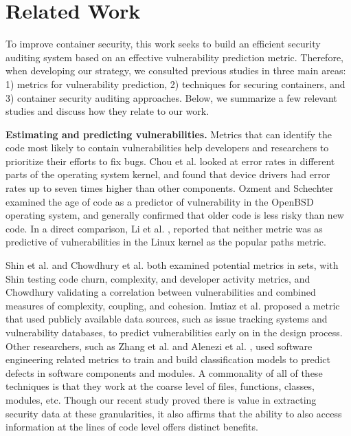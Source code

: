\section{Related Work}
\label{sec.related_work}
To improve container security, this work seeks to build an efficient security auditing system based on an effective vulnerability prediction metric. 
Therefore, when developing our strategy, we consulted previous studies in three main areas: 1) metrics for vulnerability prediction, 2) techniques for securing containers, 
and 3) container security auditing approaches. Below, we summarize a few relevant studies and discuss how they relate to our work. 

\textbf{Estimating and predicting vulnerabilities.} 
Metrics that can identify the code most likely to contain vulnerabilities help developers and researchers to prioritize their efforts to fix bugs. 
Chou et al. \cite{Chou} looked at error rates in different parts of the operating system kernel, and found that device drivers had error rates up to seven times higher than other components. 
Ozment and Schechter \cite{Ozment} examined the age of code as a predictor of vulnerability in the OpenBSD \cite{OpenBSD} operating system, 
and generally confirmed that older code is less risky than new code. In a direct comparison, Li et al. \cite{Lock-in-Pop}, 
reported that neither metric was as predictive of vulnerabilities in the Linux kernel as the popular paths metric. 

Shin et al. \cite{Shin:2011:ECC}  and Chowdhury et al. \cite{SAC10} both examined potential metrics in sets, with Shin testing code churn, complexity, and developer activity metrics, 
and Chowdhury validating a correlation between vulnerabilities and combined measures of complexity, coupling, and cohesion. 
Imtiaz et al. \cite{Imtiaz2018TowardsDV} proposed a metric that used publicly available data sources, such as issue tracking systems and vulnerability databases, 
to predict vulnerabilities early on in the design process. Other researchers, such as Zhang et al.  \cite{4459644} and Alenezi et al. \cite{Alenezi2015EvaluatingSM}, 
used software engineering related metrics to train and build classification models to predict defects in software components and modules. 
A commonality of all of these techniques is that they work at the coarse level of files, functions, classes, modules, etc. 
Though our recent study proved there is value in extracting security data at these  granularities, it also affirms that the ability to also access information at the lines of code level offers distinct benefits.


